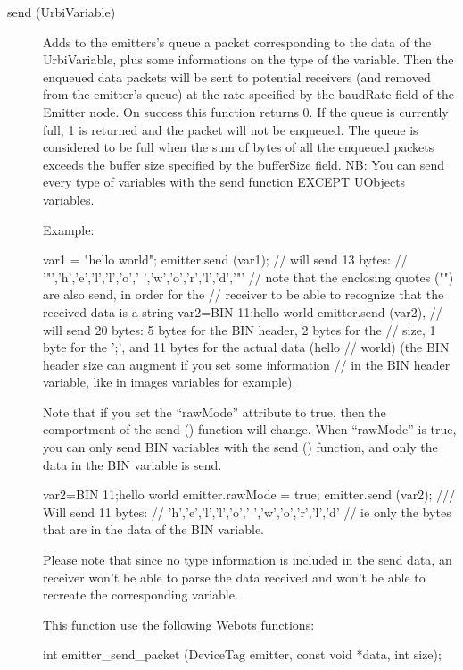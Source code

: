 \noindent
\begin{description}
\item[{send (UrbiVariable)}] Adds to the emitters's queue a packet
  corresponding to the data of the UrbiVariable, plus some
  informations on the type of the variable. Then the enqueued data
  packets will be sent to potential receivers (and removed from the
  emitter's queue) at the rate specified by the baudRate field of the
  Emitter node. On success this function returns 0. If the queue is
  currently full, 1 is returned and the packet will not be
  enqueued. The queue is considered to be full when the sum of bytes
  of all the enqueued packets exceeds the buffer size specified by the
  bufferSize field.  NB: You can send every type of \urbi variables
  with the send function EXCEPT UObjects variables.


  Example:


\begin{urbifixme}
var1 = "hello world";
emitter.send (var1);
// will send 13 bytes:
// '"','h','e','l','l','o',' ','w','o','r','l','d','"'
// note that the enclosing quotes ("") are also send, in order for the
// receiver to be able to recognize that the received data is a string
var2=BIN 11;hello world
emitter.send (var2),
// will send 20 bytes: 5 bytes for the BIN header, 2 bytes for the
// size, 1 byte for the ';', and 11 bytes for the actual data (hello
// world) (the BIN header size can augment if you set some information
// in the BIN header variable, like in images variables for example).
\end{urbifixme}

  Note that if you set the ``rawMode'' attribute to true, then the
  comportment of the send () function will change. When ``rawMode'' is
  true, you can only send BIN variables with the send () function, and
  only the data in the BIN variable is send.


\begin{urbifixme}
var2=BIN 11;hello world
emitter.rawMode = true;
emitter.send (var2);
/// Will send 11 bytes:
// 'h','e','l','l','o',' ','w','o','r','l','d'
// ie only the bytes that are in the data of the BIN variable.
\end{urbifixme}

Please note that since no type information is included in the send
data, an \urbi receiver won't be able to parse the data received and
won't be able to recreate the corresponding \urbi variable.

This function use the following Webots functions:

\begin{cxx}
int emitter_send_packet  (DeviceTag emitter, const void *data, int size);
\end{cxx}
\end{description}

